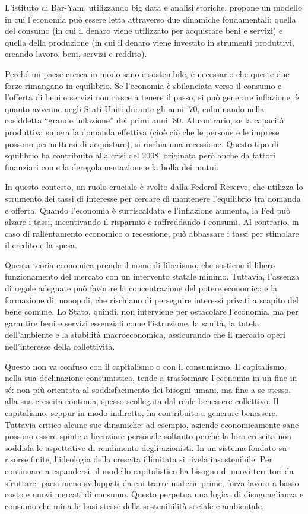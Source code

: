 \documentclass[12pt]{book} %
\begin{document}
L'istituto di Bar-Yam, utilizzando big data e analisi storiche, propone un modello in cui l’economia può essere letta attraverso due dinamiche fondamentali: quella del consumo (in cui il denaro viene utilizzato per acquistare beni e servizi) e quella della produzione (in cui il denaro viene investito in strumenti produttivi, creando lavoro, beni, servizi e reddito).

Perché un paese cresca in modo sano e sostenibile, è necessario che queste due forze rimangano in equilibrio.
Se l’economia è sbilanciata verso il consumo e l’offerta di beni e servizi non riesce a tenere il passo, si può generare inflazione: è quanto avvenne negli Stati Uniti durante gli anni '70, culminando nella cosiddetta “grande inflazione” dei primi anni ’80.
Al contrario, se la capacità produttiva supera la domanda effettiva (cioè ciò che le persone e le imprese possono permettersi di acquistare), si rischia una recessione. Questo tipo di squilibrio ha contribuito alla crisi del 2008, originata però anche da fattori finanziari come la deregolamentazione e la bolla dei mutui.

In questo contesto, un ruolo cruciale è svolto dalla Federal Reserve, che utilizza lo strumento dei tassi di interesse per cercare di mantenere l’equilibrio tra domanda e offerta.
Quando l’economia è surriscaldata e l’inflazione aumenta, la Fed può alzare i tassi, incentivando il risparmio e raffreddando i consumi. Al contrario, in caso di rallentamento economico o recessione, può abbassare i tassi per stimolare il credito e la spesa.

Questa teoria economica prende il nome di liberismo, che sostiene il libero funzionamento del mercato con un intervento statale minimo. Tuttavia, l’assenza di regole adeguate può favorire la concentrazione del potere economico e la formazione di monopoli, che rischiano di perseguire interessi privati a scapito del bene comune.
Lo Stato, quindi, non interviene per ostacolare l’economia, ma per garantire beni e servizi essenziali come l’istruzione, la sanità, la tutela dell’ambiente e la stabilità macroeconomica, assicurando che il mercato operi nell’interesse della collettività.

Questo non va confuso con il capitalismo o con il consumismo. Il capitalismo, nella sua declinazione consumistica, tende a trasformare l’economia in un fine in sé: non più orientata al soddisfacimento dei bisogni umani, ma fine a se stesso, alla sua crescita continua, spesso scollegata dal reale benessere collettivo.
Il capitalismo, seppur in modo indiretto, ha contribuito a generare benessere. Tuttavia critico alcune sue dinamiche: ad esempio, aziende economicamente sane possono essere spinte a licenziare personale soltanto perché la loro crescita non soddisfa le aspettative di rendimento degli azionisti.
In un sistema fondato su risorse finite, l’ideologia della crescita illimitata si rivela insostenibile. Per continuare a espandersi, il modello capitalistico ha bisogno di nuovi territori da sfruttare: paesi meno sviluppati da cui trarre materie prime, forza lavoro a basso costo e nuovi mercati di consumo. Questo perpetua una logica di disuguaglianza e consumo che mina le basi stesse della sostenibilità sociale e ambientale.
\end{document}
